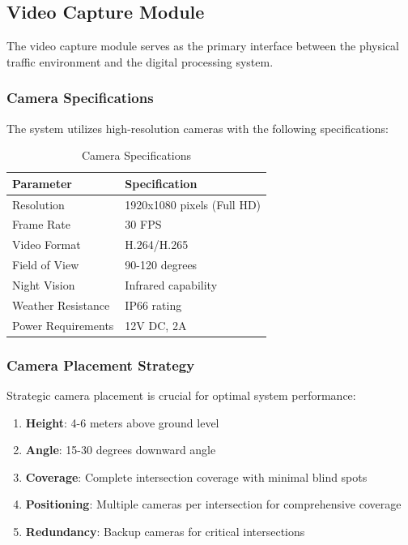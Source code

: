 \subsection{Video Capture Module}

The video capture module serves as the primary interface between the physical traffic environment and the digital processing system.

\subsubsection{Camera Specifications}

The system utilizes high-resolution cameras with the following specifications:

\begin{table}[h]
\centering
\caption{Camera Specifications}
\begin{tabular}{|l|l|}
\hline
\textbf{Parameter} & \textbf{Specification} \\
\hline
Resolution & 1920x1080 pixels (Full HD) \\
Frame Rate & 30 FPS \\
Video Format & H.264/H.265 \\
Field of View & 90-120 degrees \\
Night Vision & Infrared capability \\
Weather Resistance & IP66 rating \\
Power Requirements & 12V DC, 2A \\
\hline
\end{tabular}
\end{table}

\subsubsection{Camera Placement Strategy}

Strategic camera placement is crucial for optimal system performance:

\begin{enumerate}
    \item \textbf{Height}: 4-6 meters above ground level
    \item \textbf{Angle}: 15-30 degrees downward angle
    \item \textbf{Coverage}: Complete intersection coverage with minimal blind spots
    \item \textbf{Positioning}: Multiple cameras per intersection for comprehensive coverage
    \item \textbf{Redundancy}: Backup cameras for critical intersections
\end{enumerate}

